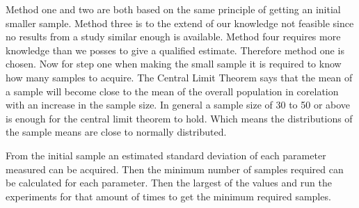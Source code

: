 Method one and two are both based on the same principle of getting an initial smaller sample. Method three is to the extend of our knowledge not feasible since no results from a study similar enough is available. Method four requires more knowledge than we posses to give a qualified estimate. Therefore method one is chosen. Now for step one when making the small sample it is required to know how many samples to acquire. The Central Limit Theorem says that the mean of a sample will become close to the mean of the overall population in corelation with an increase in the sample size. In general a sample size of 30 to 50 or above is enough for the central limit theorem to hold. Which means the distributions of the sample means are close to normally distributed.


From the initial sample an estimated standard deviation of each parameter measured can be acquired. Then the minimum number of samples required can be calculated for each parameter. Then the largest of the values and run the experiments for that amount of times to get the minimum required samples.



